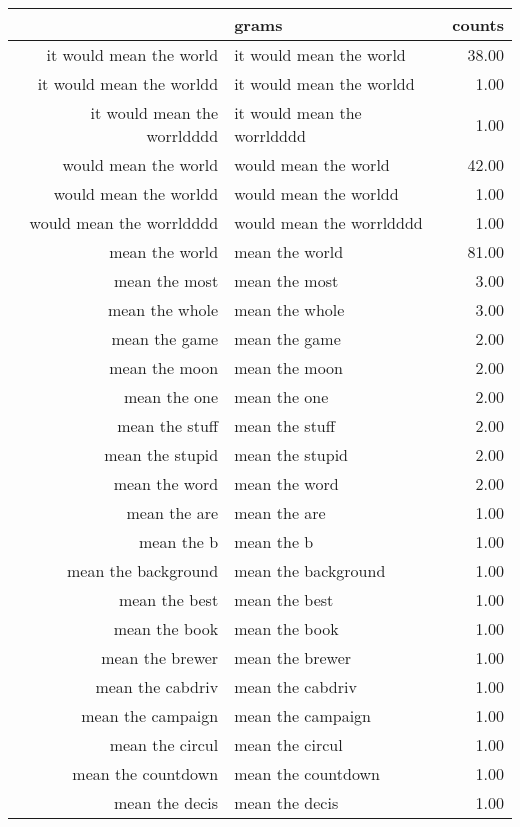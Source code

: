\begin{table}[ht]
\centering
\begin{tabular}{rlr}
  \hline
 & grams & counts \\ 
  \hline
it would mean the world & it would mean the world & 38.00 \\ 
  it would mean the worldd & it would mean the worldd & 1.00 \\ 
  it would mean the worrldddd & it would mean the worrldddd & 1.00 \\ 
  would mean the world & would mean the world & 42.00 \\ 
  would mean the worldd & would mean the worldd & 1.00 \\ 
  would mean the worrldddd & would mean the worrldddd & 1.00 \\ 
  mean the world & mean the world & 81.00 \\ 
  mean the most & mean the most & 3.00 \\ 
  mean the whole & mean the whole & 3.00 \\ 
  mean the game & mean the game & 2.00 \\ 
  mean the moon & mean the moon & 2.00 \\ 
  mean the one & mean the one & 2.00 \\ 
  mean the stuff & mean the stuff & 2.00 \\ 
  mean the stupid & mean the stupid & 2.00 \\ 
  mean the word & mean the word & 2.00 \\ 
  mean the are & mean the are & 1.00 \\ 
  mean the b & mean the b & 1.00 \\ 
  mean the background & mean the background & 1.00 \\ 
  mean the best & mean the best & 1.00 \\ 
  mean the book & mean the book & 1.00 \\ 
  mean the brewer & mean the brewer & 1.00 \\ 
  mean the cabdriv & mean the cabdriv & 1.00 \\ 
  mean the campaign & mean the campaign & 1.00 \\ 
  mean the circul & mean the circul & 1.00 \\ 
  mean the countdown & mean the countdown & 1.00 \\ 
  mean the decis & mean the decis & 1.00 \\ 

\end{tabular}
\end{table}

